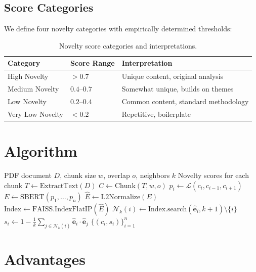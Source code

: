 \documentclass[11pt,a4paper]{article}
\begin{document}
\subsection{Score Categories}

We define four novelty categories with empirically determined thresholds:

\begin{table}[h]
\centering
\begin{tabular}{lll}
\toprule
Category & Score Range & Interpretation \\
\midrule
High Novelty & $> 0.7$ & Unique content, original analysis \\
Medium Novelty & $0.4$--$0.7$ & Somewhat unique, builds on themes \\
Low Novelty & $0.2$--$0.4$ & Common content, standard methodology \\
Very Low Novelty & $< 0.2$ & Repetitive, boilerplate \\
\bottomrule
\end{tabular}
\caption{Novelty score categories and interpretations.}
\label{tab:categories}
\end{table}

\section{Algorithm}

\begin{algorithm}
\caption{LLM-Based Novelty Detection}
\begin{algorithmic}[1]
\Require PDF document $D$, chunk size $w$, overlap $o$, neighbors $k$
\Ensure Novelty scores for each chunk
\State $T \gets \text{ExtractText}(D)$
\State $C \gets \text{Chunk}(T, w, o)$ 
    \State $p_i \gets \mathcal{L}(c_i, c_{i-1}, c_{i+1})$ 
\EndFor
\State $E \gets \text{SBERT}(p_1, \ldots, p_n)$ 
\State $\hat{E} \gets \text{L2Normalize}(E)$
\State $\text{Index} \gets \text{FAISS.IndexFlatIP}(\hat{E})$
    \State $\mathcal{N}_k(i) \gets \text{Index.search}(\hat{\mathbf{e}}_i, k+1) \setminus \{i\}$
    \State $s_i \gets 1 - \frac{1}{k}\sum_{j \in \mathcal{N}_k(i)} \hat{\mathbf{e}}_i \cdot \hat{\mathbf{e}}_j$
\EndFor
\State \Return $\{(c_i, s_i)\}_{i=1}^n$
\end{algorithmic}
\end{algorithm}

\section{Advantages}
\end{document}
